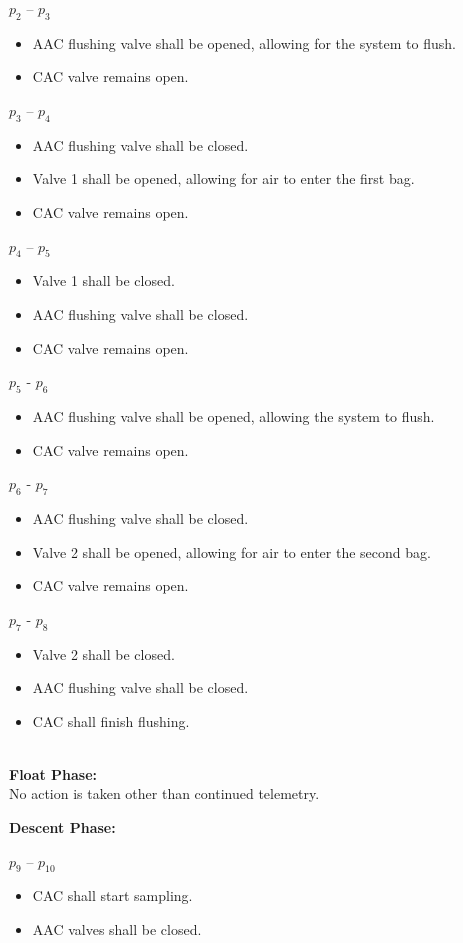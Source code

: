 $p_2$ – $p_3$
\begin{itemize}
    \item AAC flushing valve shall be opened, allowing for the system to flush.
    \item CAC valve remains open.
    \end{itemize}
$p_3$ – $p_4$
\begin{itemize}
    \item AAC flushing valve shall be closed.
    \item Valve 1 shall be opened, allowing for air to enter the first bag.
    \item CAC valve remains open.
    \end{itemize}
$p_4$ – $p_5$
\begin{itemize}
    \item Valve 1 shall be closed.
    \item AAC flushing valve shall be closed.
    \item CAC valve remains open.
    \end{itemize}
$p_5$ - $p_6$    
 \begin{itemize}
    \item AAC flushing valve shall be opened, allowing the system to flush. 
    \item CAC valve remains open.
    \end{itemize}
$p_6$ - $p_7$
\begin{itemize}
    \item AAC flushing valve shall be closed.
    \item Valve 2 shall be opened, allowing for air to enter the second bag.
    \item CAC valve remains open.
    \end{itemize}
$p_7$ - $p_8$
\begin{itemize}
    \item Valve 2 shall be closed.
    \item AAC flushing valve shall be closed.
    \item CAC shall finish flushing.
    \end{itemize}    
    



\textbf{\\Float Phase:}\\
No action is taken other than continued telemetry.
 
\textbf{Descent Phase:}
 
$p_9$ – $p_{10}$
\begin{itemize}
    \item CAC shall start sampling. 
    \item AAC valves shall be closed.
\end{itemize}

